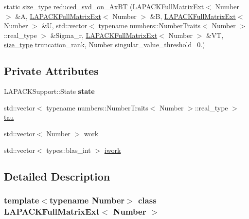 \begin{DoxyCompactItemize}
\item 
static \hyperlink{classLAPACKFullMatrixExt_a5cf5f4a6104dc17029210b5ca52bf574}{size\+\_\+type} \hyperlink{classLAPACKFullMatrixExt_a56dbf804ab7f3ffb3ed3a09d5b4e5170}{reduced\+\_\+svd\+\_\+on\+\_\+\+Ax\+BT} (\hyperlink{classLAPACKFullMatrixExt}{L\+A\+P\+A\+C\+K\+Full\+Matrix\+Ext}$<$ Number $>$ \&A, \hyperlink{classLAPACKFullMatrixExt}{L\+A\+P\+A\+C\+K\+Full\+Matrix\+Ext}$<$ Number $>$ \&B, \hyperlink{classLAPACKFullMatrixExt}{L\+A\+P\+A\+C\+K\+Full\+Matrix\+Ext}$<$ Number $>$ \&U, std\+::vector$<$ typename numbers\+::\+Number\+Traits$<$ Number $>$\+::real\+\_\+type $>$ \&Sigma\+\_\+r, \hyperlink{classLAPACKFullMatrixExt}{L\+A\+P\+A\+C\+K\+Full\+Matrix\+Ext}$<$ Number $>$ \&VT, \hyperlink{classLAPACKFullMatrixExt_a5cf5f4a6104dc17029210b5ca52bf574}{size\+\_\+type} truncation\+\_\+rank, Number singular\+\_\+value\+\_\+threshold=0.)
\end{DoxyCompactItemize}
\subsection*{Private Attributes}
\begin{DoxyCompactItemize}
\item 
\mbox{\label{classLAPACKFullMatrixExt_adec2cd643cd2bf3d66293f43e72af687}} 
L\+A\+P\+A\+C\+K\+Support\+::\+State {\bfseries state}
\item 
std\+::vector$<$ typename numbers\+::\+Number\+Traits$<$ Number $>$\+::real\+\_\+type $>$ \hyperlink{classLAPACKFullMatrixExt_a91fb784892cbe9d24ad2062fbf642635}{tau}
\item 
std\+::vector$<$ Number $>$ \hyperlink{classLAPACKFullMatrixExt_a971d29c6d7664fca553b6ba377519946}{work}
\item 
std\+::vector$<$ types\+::blas\+\_\+int $>$ \hyperlink{classLAPACKFullMatrixExt_ac091f1f6af485b451c4c9398abb67230}{iwork}
\end{DoxyCompactItemize}


\subsection{Detailed Description}
\subsubsection*{template$<$typename Number$>$\newline
class L\+A\+P\+A\+C\+K\+Full\+Matrix\+Ext$<$ Number $>$}

